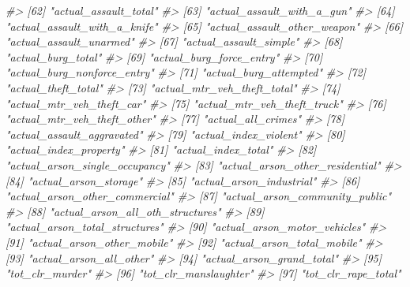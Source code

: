 \documentclass[
]{krantz}
\makeatletter
\newenvironment{Shaded}{\begin{snugshade}}{\end{snugshade}}
\newcommand{\CommentTok}[1]{\textcolor[rgb]{0.37,0.37,0.37}{\textit{#1}}}
\newenvironment{kframe}{%
\medskip{}
\setlength{\fboxsep}{.8em}
 \def\at@end@of@kframe{}%
 \ifinner\ifhmode%
  \def\at@end@of@kframe{\end{minipage}}%
  \begin{minipage}{\columnwidth}%
 \fi\fi%
 \def\FrameCommand##1{\hskip\@totalleftmargin \hskip-\fboxsep
 \colorbox{shadecolor}{##1}\hskip-\fboxsep
     \hskip-\linewidth \hskip-\@totalleftmargin \hskip\columnwidth}%
 \MakeFramed {\advance\hsize-\width
   \@totalleftmargin\z@ \linewidth\hsize
   \@setminipage}}%
 {\par\unskip\endMakeFramed%
 \at@end@of@kframe}
\renewenvironment{Shaded}{\begin{kframe}}{\end{kframe}}
\makeatother
\begin{document}
\begin{Shaded}
\begin{Highlighting}[]
\CommentTok{\#\textgreater{}  [62] "actual\_assault\_total"            }
\CommentTok{\#\textgreater{}  [63] "actual\_assault\_with\_a\_gun"       }
\CommentTok{\#\textgreater{}  [64] "actual\_assault\_with\_a\_knife"     }
\CommentTok{\#\textgreater{}  [65] "actual\_assault\_other\_weapon"     }
\CommentTok{\#\textgreater{}  [66] "actual\_assault\_unarmed"          }
\CommentTok{\#\textgreater{}  [67] "actual\_assault\_simple"           }
\CommentTok{\#\textgreater{}  [68] "actual\_burg\_total"               }
\CommentTok{\#\textgreater{}  [69] "actual\_burg\_force\_entry"         }
\CommentTok{\#\textgreater{}  [70] "actual\_burg\_nonforce\_entry"      }
\CommentTok{\#\textgreater{}  [71] "actual\_burg\_attempted"           }
\CommentTok{\#\textgreater{}  [72] "actual\_theft\_total"              }
\CommentTok{\#\textgreater{}  [73] "actual\_mtr\_veh\_theft\_total"      }
\CommentTok{\#\textgreater{}  [74] "actual\_mtr\_veh\_theft\_car"        }
\CommentTok{\#\textgreater{}  [75] "actual\_mtr\_veh\_theft\_truck"      }
\CommentTok{\#\textgreater{}  [76] "actual\_mtr\_veh\_theft\_other"      }
\CommentTok{\#\textgreater{}  [77] "actual\_all\_crimes"               }
\CommentTok{\#\textgreater{}  [78] "actual\_assault\_aggravated"       }
\CommentTok{\#\textgreater{}  [79] "actual\_index\_violent"            }
\CommentTok{\#\textgreater{}  [80] "actual\_index\_property"           }
\CommentTok{\#\textgreater{}  [81] "actual\_index\_total"              }
\CommentTok{\#\textgreater{}  [82] "actual\_arson\_single\_occupancy"   }
\CommentTok{\#\textgreater{}  [83] "actual\_arson\_other\_residential"  }
\CommentTok{\#\textgreater{}  [84] "actual\_arson\_storage"            }
\CommentTok{\#\textgreater{}  [85] "actual\_arson\_industrial"         }
\CommentTok{\#\textgreater{}  [86] "actual\_arson\_other\_commercial"   }
\CommentTok{\#\textgreater{}  [87] "actual\_arson\_community\_public"   }
\CommentTok{\#\textgreater{}  [88] "actual\_arson\_all\_oth\_structures" }
\CommentTok{\#\textgreater{}  [89] "actual\_arson\_total\_structures"   }
\CommentTok{\#\textgreater{}  [90] "actual\_arson\_motor\_vehicles"     }
\CommentTok{\#\textgreater{}  [91] "actual\_arson\_other\_mobile"       }
\CommentTok{\#\textgreater{}  [92] "actual\_arson\_total\_mobile"       }
\CommentTok{\#\textgreater{}  [93] "actual\_arson\_all\_other"          }
\CommentTok{\#\textgreater{}  [94] "actual\_arson\_grand\_total"        }
\CommentTok{\#\textgreater{}  [95] "tot\_clr\_murder"                  }
\CommentTok{\#\textgreater{}  [96] "tot\_clr\_manslaughter"            }
\CommentTok{\#\textgreater{}  [97] "tot\_clr\_rape\_total"              }

\end{Highlighting}
\end{Shaded}
\end{document}
